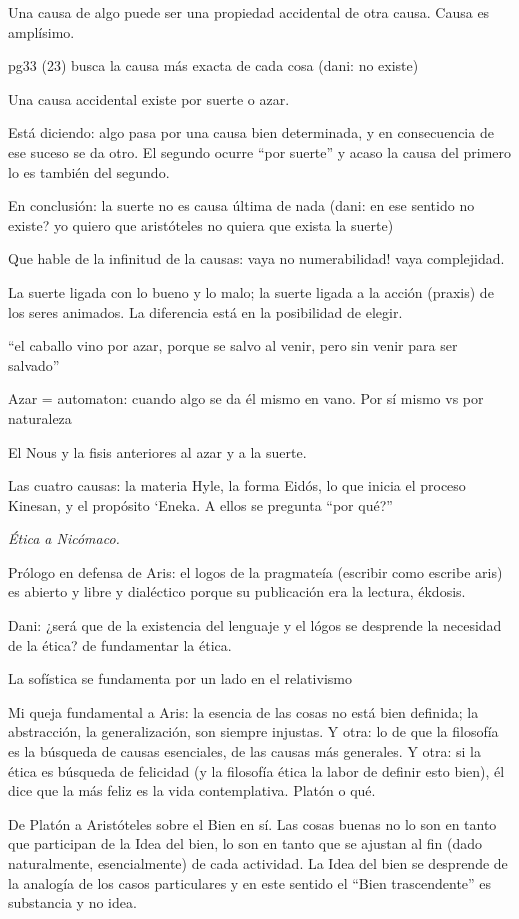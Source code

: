 Una causa de algo puede ser una propiedad
accidental de otra causa. Causa es amplísimo.

pg33 (23) busca la causa más exacta de cada
cosa (dani: no existe)

Una causa accidental existe por suerte o
azar.

Está diciendo: algo pasa por una causa bien
determinada, y en consecuencia de ese suceso
se da otro. El segundo ocurre ``por suerte''
y acaso la causa del primero lo es también
del segundo.

En conclusión: la suerte no es causa última
de nada (dani: en ese sentido no existe? yo
quiero que aristóteles no quiera que exista
la suerte)

Que hable de la infinitud de la causas: vaya
no numerabilidad! vaya complejidad.

La suerte ligada con lo bueno y lo malo; la
suerte ligada a la acción (praxis) de los
seres animados. La diferencia está en la
posibilidad de elegir.

``el caballo vino por azar, porque se salvo
al venir, pero sin venir para ser salvado''

Azar = automaton: cuando algo se da él mismo
en vano. Por sí mismo vs por naturaleza

El Nous y la fisis anteriores al azar y a la
suerte.

Las cuatro causas: la materia Hyle, la forma
Eidós, lo que inicia el proceso Kinesan, y el
propósito `Eneka. A ellos se pregunta ``por
qué?''

\medskip\noindent\emph{Ética a Nicómaco.}

Prólogo en defensa de Aris: el logos de la
pragmateía (escribir como escribe aris) es
abierto y libre y dialéctico porque su
publicación era la lectura, ékdosis.

Dani: ¿será que de la existencia del lenguaje
y el lógos se desprende la necesidad de la
ética? de fundamentar la ética.

La sofística se fundamenta por un lado en el
relativismo

Mi queja fundamental a Aris: la esencia de
las cosas no está bien definida; la
abstracción, la generalización, son siempre
injustas. Y otra: lo de que la filosofía es
la búsqueda de causas esenciales, de las
causas más generales. Y otra: si la ética es
búsqueda de felicidad (y la filosofía ética
la labor de definir esto bien), él dice que
la más feliz es la vida contemplativa. Platón
o qué.

De Platón a Aristóteles sobre el Bien en sí.
Las cosas buenas no lo son en tanto que
participan de la Idea del bien, lo son en
tanto que se ajustan al fin (dado
naturalmente, esencialmente) de cada
actividad. La Idea del bien se desprende de
la analogía de los casos particulares y en
este sentido el ``Bien trascendente'' es
substancia y no idea.

